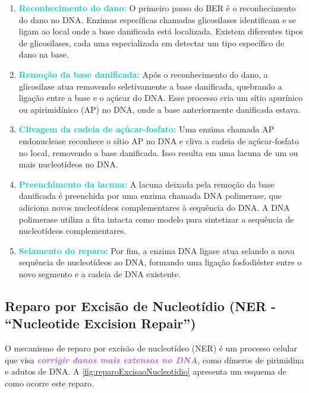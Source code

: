 \documentclass[11pt,a4paper]{article}
\begin{document}
	\begin{enumerate}[label=\textcolor{CarnationPink}{\arabic*${}^\circ $}]
		\item \textcolor{DarkTurquoise}{\textbf{Reconhecimento do dano:}} O primeiro passo do BER é o reconhecimento do dano no DNA. Enzimas específicas chamadas glicosilases identificam e se ligam ao local onde a base danificada está localizada. Existem diferentes tipos de glicosilases, cada uma especializada em detectar um tipo específico de dano na base.
		\item \textcolor{DarkTurquoise}{\textbf{Remoção da base danificada: }} Após o reconhecimento do dano, a glicosilase atua removendo seletivamente a base danificada, quebrando a ligação entre a base e o açúcar do DNA. Esse processo cria um sítio apurínico ou apirimidínico (AP) no DNA, onde a base anteriormente danificada estava.
		\item \textcolor{DarkTurquoise}{\textbf{Clivagem da cadeia de açúcar-fosfato:}} Uma enzima chamada AP endonuclease reconhece o sítio AP no DNA e cliva a cadeia de açúcar-fosfato no local, removendo a base danificada. Isso resulta em uma lacuna de um ou mais nucleotídeos no DNA.
		\item \textcolor{DarkTurquoise}{\textbf{Preenchimento da lacuna:}} A lacuna deixada pela remoção da base danificada é preenchida por uma enzima chamada DNA polimerase, que adiciona novos nucleotídeos complementares à sequência do DNA. A DNA polimerase utiliza a fita intacta como modelo para sintetizar a sequência de nucleotídeos complementares. 
		\item \textcolor{DarkTurquoise}{\textbf{Selamento do reparo:}} Por fim, a enzima DNA ligase atua selando a nova sequência de nucleotídeos ao DNA, formando uma ligação fosfodiéster entre o novo segmento e a cadeia de DNA existente.
	\end{enumerate}

\subsection*{Reparo por Excisão de Nucleotídio (NER - ``Nucleotide Excision Repair'')}

	O mecanismo de reparo por excisão de nucleotídeo (NER) é um processo celular que visa \textcolor{MediumOrchid}{\textbf{\textit{corrigir danos mais extensos no DNA}}}, como dímeros de pirimidina e adutos de DNA. A \ref{fig:reparoExcisaoNucleotidio} apresenta um esquema de como ocorre este reparo.
\end{document}
